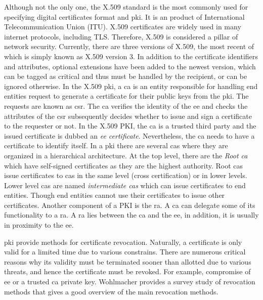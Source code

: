 Although not the only one, the X.509 standard \cite{x509} is the most commonly used for specifying digital certificates format and \gls{pki}. It is an product of International Telecommunication Union (ITU). X.509 certificates are widely used in many internet protocols, including TLS. Therefore, X.509 is considered a pillar of network security. Currently, there are three versions of X.509, the most recent of which is simply known as X.509 version 3. In addition to the certificate identifiers and attributes, optional extensions have been added to the newest version, which can be tagged as critical and thus must be handled by the recipient, or can be ignored otherwise. In the X.509 \gls{pki}, a \gls{ca} is an entity responsible for handling end entities request to generate a certificate for their public keys from the \gls{pki}. The requests are known as \gls{csr}. The \gls{ca} verifies the identity of the \gls{ee} and checks the attributes of the \gls{csr} subsequently decides whether to issue and sign a certificate to the requester or not. In the X.509 PKI, the \gls{ca} is a trusted third party and the issued certificate is dubbed an \textit{\gls{ee} certificate}. Nevertheless, the \gls{ca} needs to have a certificate to identify itself. In a \gls{pki} there are several \glspl{ca} where they are organized in a hierarchical architecture. At the top level, there are the \textit{Root \gls{ca}} which have self-signed certificates as they are the highest authority. Root \glspl{ca} issue certificates to \glspl{ca} in the same level (cross certification) or in lower levels. Lower level \glspl{ca} are named \textit{intermediate \glspl{ca}} which can issue certificates to end entities. Though end entities cannot use their certificates to issue other certificates. Another component of a PKI is the \gls{ra}. A \gls{ca} can delegate some of its functionality to a \gls{ra}. A \gls{ra} lies between the \gls{ca} and the \gls{ee}, in addition, it is usually in proximity to the \gls{ee}.
\par
\gls{pki} provide methods for certificate revocation. Naturally, a certificate is only valid for a limited time due to various constrains. There are numerous critical reasons why its validity must be terminated sooner than allotted due to various threats, and hence the certificate must be revoked. For example, compromise of \gls{ee} or a trusted \gls{ca} private key. Wohlmacher \cite{revocationSurvey} provides a survey study of revocation methods that gives a good overview of the main revocation methods.